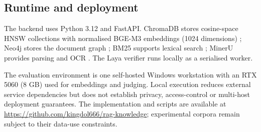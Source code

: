 \subsection{Runtime and deployment}
\label{sec:impl-runtime}

The backend uses Python 3.12 and FastAPI. ChromaDB stores cosine-space HNSW
collections with normalised BGE-M3 embeddings (1024 dimensions)
\cite{chroma,hnsw,bge-m3}; Neo4j stores the document graph \cite{neo4j};
BM25 supports lexical search \cite{bm25}; MinerU provides parsing and OCR
\cite{mineru}. The Laya verifier runs locally as a serialised worker.

The evaluation environment is one self-hosted Windows workstation with an
RTX 5060 (8 GB) used for embeddings and judging. Local execution reduces
external service dependencies but does not establish privacy, access-control or
multi-host deployment guarantees. The implementation and scripts are available
at \url{https://github.com/kingdol666/rag-knowledge}; experimental corpora
remain subject to their data-use constraints.
